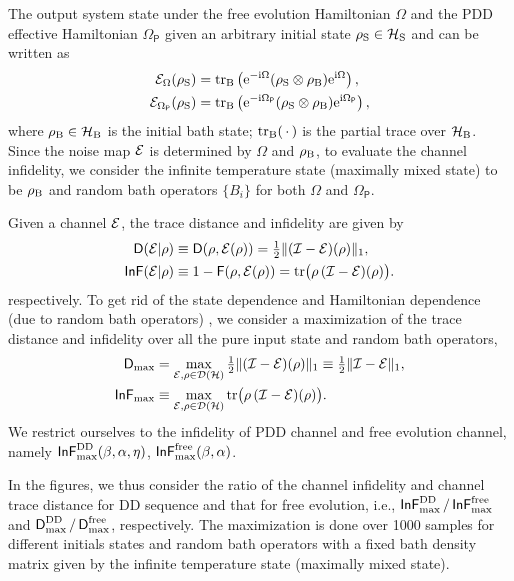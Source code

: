 \documentclass[aps,pra,reprint,superscriptaddress]{revtex4-2}
\newcommand{\Opdd}{\Omega_{\mathsf{P}}}
\begin{document}
The output system state under the free evolution Hamiltonian $\Omega$ and the PDD effective Hamiltonian $\Opdd$ given an arbitrary initial state $\rho_\mathrm{S}\in\mathcal{H}_{\mathrm{S}}$ and can be written as
\begin{align}\label{eq:output-rhos}
    \cE_{\Omega}(\rhoS) &= \trB  \left(
\upe^{-\upi \Omega} (\rhoS \otimes \rhoB) \upe^{\upi \Omega} \right), \\
    \cE_{\Opdd}(\rhoS) &= \trB  \left(
\upe^{-\upi \Opdd} (\rhoS \otimes \rhoB) \upe^{\upi \Opdd} \right),
\end{align}
where $\rho_\mathrm{B}\in\mathcal{H}_{\mathrm{B}}$ is the initial bath state; $\operatorname{\operatorname{tr}_\mathrm{B}}({\,\cdot\,})$ is the partial trace over $\mathcal{H}_{\mathrm{B}}$. Since the noise map $\mathcal{E}$ is determined by $\Omega$ and $\rho_\mathrm{B}$, to evaluate the channel infidelity, we consider the infinite temperature state (maximally mixed state) to be $\rho_\mathrm{B}$ and random bath operators $\{B_i\}$ for both $\Omega$ and $\Opdd$.


Given a channel $\mathcal{E}$, the trace distance and infidelity are given by
\begin{align}\label{eq:trd-def}
    \operatorname{\mathsf{D}}(\mathcal{E}|\rho) &\equiv \operatorname{\mathsf{D}}(\rho, \mathcal{E}(\rho)) = \tfrac{1}{2} \Vert { (\mathcal{I}-\mathcal{E}) (\rho)} \Vert_1, \\
    \operatorname{\mathsf{InF}}(\mathcal{E}|\rho) &\equiv 1- \operatorname{\mathsf{F}}(\rho, \mathcal{E}(\rho)) = \operatorname{tr}\bigl(\rho\, (\mathcal{I} -\mathcal{E})(\rho)\bigr).\label{eq:inf-def}
\end{align}
respectively. To get rid of the state dependence and Hamiltonian dependence (due to random bath operators) , we consider a maximization of the trace distance and infidelity over all the pure input state and random bath operators,
\begin{align}
    \operatorname{\mathsf{D}}_{\max} &= \max_{{\mathcal{E}}, \rho\in\mathcal{D}(\mathcal{H})} \tfrac{1}{2} \Vert { (\mathcal{I}- {\mathcal{E}}) (\rho)} \Vert_1 \equiv \tfrac{1}{2} \Vert { \mathcal{I}-\mathcal{E}} \Vert_1, \\
    \operatorname{\mathsf{InF}}_{\max} &\equiv \max_{ {\mathcal{E}},\rho\in\mathcal{D}(\mathcal{H})} \operatorname{tr}\bigl(\rho\, (\mathcal{I} -{\mathcal{E}})(\rho)\bigr).
\end{align}
We restrict ourselves to the infidelity of PDD channel and free evolution channel, namely $\operatorname{\mathsf{InF}}^{\rm DD}_{\rm max}(\beta, \alpha, \eta)$,  $\operatorname{\mathsf{InF}}^{\rm free}_{\rm max}(\beta, \alpha)$. 

In the figures, we thus consider the ratio of the channel infidelity and channel trace distance for DD sequence and that for free evolution, i.e., $\operatorname{\mathsf{InF}}^{\rm DD}_{\rm max} / \operatorname{\mathsf{InF}}^{\rm free}_{\rm max}$ and $\operatorname{\mathsf{D}}^{\rm DD}_{\rm max} / \operatorname{\mathsf{D}}^{\rm free}_{\rm max}$, respectively. The maximization is done over 1000 samples for different initials states and random bath operators with a fixed bath density matrix given by the infinite temperature state (maximally mixed state).  
\end{document}
